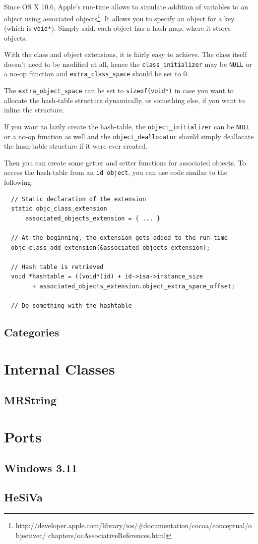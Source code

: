 Since OS X 10.6, Apple's run-time allows to simulate addition of variables to an object using associated objects\footnote{http://developer.apple.com/library/ios/#documentation/cocoa/conceptual/objectivec/ chapters/ocAssociativeReferences.html}. It allows you to specify an object for a key (which is \verb=void*=). Simply said, each object has a hash map, where it stores objects.

With the class and object extensions, it is fairly easy to achieve. The class itself doesn't need to be modified at all, hence the \verb=class_initializer= may be \verb=NULL= or a no-op function and \verb=extra_class_space= should be set to 0.

The \verb=extra_object_space= can be set to \verb=sizeof(void*)= in case you want to allocate the hash-table structure dynamically, or something else, if you want to inline the structure.

If you want to lazily create the hash-table, the \verb=object_initializer= can be \verb=NULL= or a no-op function as well and the \verb=object_deallocator= should simply deallocate the hash-table structure if it were ever created.

Then you can create some getter and setter functions for associated objects. To access the hash-table from an \verb=id object=, you can use code similar to the following:

\begin{verbatim}
  // Static declaration of the extension
  static objc_class_extension 
      associated_objects_extension = { ... }

  // At the beginning, the extension gets added to the run-time
  objc_class_add_extension(&associated_objects_extension);

  // Hash table is retrieved
  void *hashtable = ((void*)id) + id->isa->instance_size 
        + associated_objects_extension.object_extra_space_offset;
        
  // Do something with the hashtable
\end{verbatim}

\subsection{Categories}



\section{Internal Classes}
\subsection{MRString}

\section{Ports}
\subsection{Windows 3.11}
\subsection{HeSiVa}
